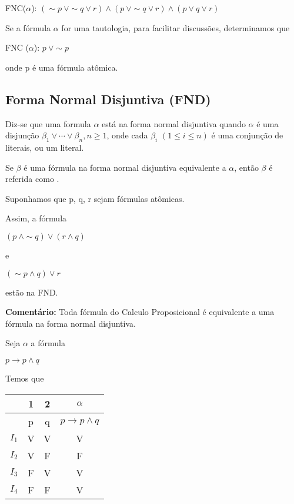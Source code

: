 \noindent FNC($\alpha$): $(\sim p\ \lor \sim q \lor r) \land (p\ \lor \sim q \lor r) \land (p \lor q \lor r)$

Se a fórmula $\alpha$ for uma tautologia, para facilitar discussões, determinamos que

\centerline{FNC ($\alpha$): $p\ \lor \sim p$}

onde p é uma fórmula atômica.

\pagebreak


\subsection{Forma Normal Disjuntiva (FND)}

\begin{defi}
    Diz-se que uma formula $\alpha$ está na forma normal disjuntiva quando $\alpha$ é uma disjunção $\beta_1 \lor \cdots \lor \beta_n, n \geq 1$, onde cada $\beta_i$ $(1 \leq i \leq n)$ é uma conjunção de literais, ou um literal.
\end{defi}

\begin{defi}
    Se $\beta$ é uma fórmula na forma normal disjuntiva equivalente a $\alpha$, então $\beta$ é referida como .
\end{defi}

\begin{exemplo}
    Suponhamos que p, q, r sejam fórmulas atômicas.

    Assim, a fórmula

    \begin{center}
        $(p\ \land \sim q) \lor (r \land q)$

        e

        $(\sim p \land q) \lor r$
    \end{center}

    estão na FND.
\end{exemplo}

\noindent \textbf{Comentário:} Toda fórmula do Calculo Proposicional é equivalente a uma fórmula na forma normal disjuntiva.

\begin{exemplo}
    Seja $\alpha$ a fórmula

    \centerline{$p \to p \land q$}
\end{exemplo}

Temos que

\begin{tabular}{c | c c c}
    & 1 & 2 & $\alpha$ \\ \hline
    & p & q & $p \to p \land q$ \\
    $I_1$ & V & V & V \\
    $I_2$ & V & F & F \\
    $I_3$ & F & V & V \\
    $I_4$ & F & F & V \\
\end{tabular}

